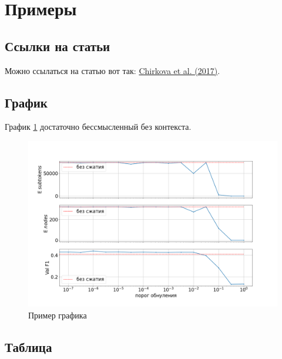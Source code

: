 \documentclass[a4paper,14pt]{extarticle}
\newcommand{\bibref}[3]{\hyperlink{#1}{#2 (#3)}} %
\begin{document}
\newpage

{
	\hypersetup{linkcolor=black}
	\tableofcontents
}

\newpage
\section{Примеры} 
\subsection{Ссылки на статьи}

Можно ссылаться на статью вот так:  \bibref{chirkova18}{Chirkova et al.}{2017}.

\subsection{График}

График \ref{fig:by_epochs} достаточно бессмысленный без контекста.

\begin{figure}[h!]
	\centering
	\includegraphics[width=1\textwidth]{example.png}
	\caption{Пример графика}
	\label{fig:by_epochs}
\end{figure}


\subsection{Таблица}
\end{document}
